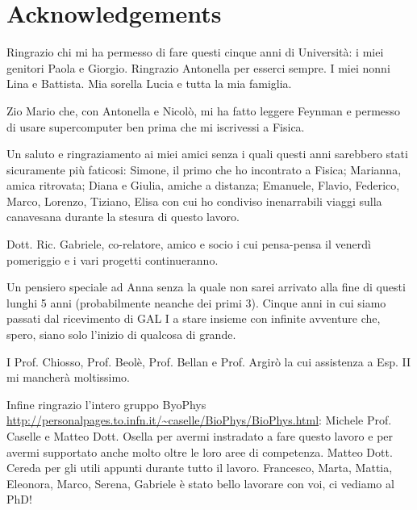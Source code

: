 \chapter*{Acknowledgements}
Ringrazio chi mi ha permesso di fare questi cinque anni di Università: i miei genitori Paola e Giorgio.
Ringrazio Antonella per esserci sempre. I miei nonni Lina e Battista. Mia sorella Lucia e tutta la mia famiglia.

Zio Mario che, con Antonella e Nicolò, mi ha fatto leggere Feynman e permesso di usare supercomputer ben prima che mi iscrivessi a Fisica.

Un saluto e ringraziamento ai miei amici senza i quali questi anni sarebbero stati sicuramente più faticosi: Simone, il primo che ho incontrato a Fisica; Marianna, amica ritrovata; Diana e Giulia, amiche a distanza; Emanuele, Flavio, Federico, Marco, Lorenzo, Tiziano, Elisa con cui ho condiviso inenarrabili viaggi sulla canavesana durante la stesura di questo lavoro.

Dott. Ric. Gabriele, co-relatore, amico e socio i cui pensa-pensa il venerdì pomeriggio e i vari progetti continueranno.

Un pensiero speciale ad Anna senza la quale non sarei arrivato alla fine di questi lunghi 5 anni (probabilmente neanche dei primi 3). Cinque anni in cui siamo passati dal ricevimento di GAL I a stare insieme con infinite avventure che, spero, siano solo l'inizio di qualcosa di grande.

I Prof. Chiosso, Prof. Beolè, Prof. Bellan e Prof. Argirò la cui assistenza a Esp. II mi mancherà moltissimo.

Infine ringrazio l'intero gruppo ByoPhys \\ \url{http://personalpages.to.infn.it/~caselle/BioPhys/BioPhys.html}: Michele Prof. Caselle e Matteo Dott. Osella per avermi instradato a fare questo lavoro e per avermi supportato anche molto oltre le loro aree di competenza. Matteo Dott. Cereda per gli utili appunti durante tutto il lavoro.
Francesco, Marta, Mattia, Eleonora, Marco, Serena, Gabriele è stato bello lavorare con voi, ci vediamo al PhD!
